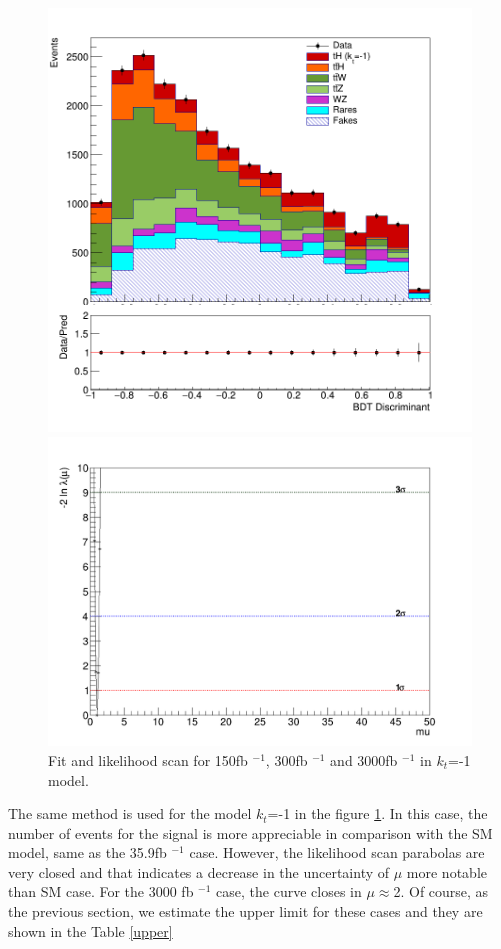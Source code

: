 \begin{linenumbers}
\begin{figure}[!htbp]
		\begin{minipage}[b]{0.48\textwidth}
			\includegraphics[width=\textwidth]{Chapter4/kt-1/3000fb/simple-3000-kt-1.png}
		\end{minipage}
		\hfill
		\begin{minipage}[b]{0.48\textwidth}
			\includegraphics[width=\textwidth]{Chapter4/kt-1/3000fb/Likelihood.png}
		\end{minipage}
		\caption{Fit and likelihood scan for 150fb $^{-1}$, 300fb $^{-1}$ and 3000fb $^{-1}$ in $k_t$=-1 model.}
		\label{hm1}
	\end{figure}
	The same method is used for the model $k_t$=-1 in the figure \ref{hm1}. In this case, the number of events for the signal is more appreciable in comparison with the SM model, same as the 35.9fb $^{-1}$ case. However, the likelihood scan parabolas are very closed and that indicates a decrease in the uncertainty of $\mu$ more notable than SM case. For the 3000 fb $^{-1}$ case, the curve closes in $\mu \approx $2. 
	Of course, as the previous section, we estimate the upper limit for these cases and they are shown in the Table \ref{upper}
	

\end{linenumbers}
